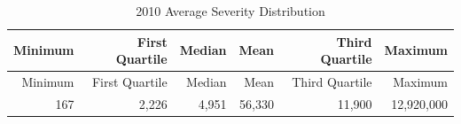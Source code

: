\documentclass[]{book}
\begin{document}
\begin{longtable}[]{@{}rrrrrr@{}}
\caption{\label{tab:Severity2010} 2010 Average Severity
Distribution}\tabularnewline
\toprule
\begin{minipage}[b]{0.12\columnwidth}\raggedleft\strut
Minimum\strut
\end{minipage} & \begin{minipage}[b]{0.13\columnwidth}\raggedleft\strut
First Quartile\strut
\end{minipage} & \begin{minipage}[b]{0.10\columnwidth}\raggedleft\strut
Median\strut
\end{minipage} & \begin{minipage}[b]{0.10\columnwidth}\raggedleft\strut
Mean\strut
\end{minipage} & \begin{minipage}[b]{0.13\columnwidth}\raggedleft\strut
Third Quartile\strut
\end{minipage} & \begin{minipage}[b]{0.14\columnwidth}\raggedleft\strut
Maximum\strut
\end{minipage}\tabularnewline
\midrule
\endfirsthead
\toprule
\begin{minipage}[b]{0.12\columnwidth}\raggedleft\strut
Minimum\strut
\end{minipage} & \begin{minipage}[b]{0.13\columnwidth}\raggedleft\strut
First Quartile\strut
\end{minipage} & \begin{minipage}[b]{0.10\columnwidth}\raggedleft\strut
Median\strut
\end{minipage} & \begin{minipage}[b]{0.10\columnwidth}\raggedleft\strut
Mean\strut
\end{minipage} & \begin{minipage}[b]{0.13\columnwidth}\raggedleft\strut
Third Quartile\strut
\end{minipage} & \begin{minipage}[b]{0.14\columnwidth}\raggedleft\strut
Maximum\strut
\end{minipage}\tabularnewline
\midrule
\endhead
\begin{minipage}[t]{0.12\columnwidth}\raggedleft\strut
167\strut
\end{minipage} & \begin{minipage}[t]{0.13\columnwidth}\raggedleft\strut
2,226\strut
\end{minipage} & \begin{minipage}[t]{0.10\columnwidth}\raggedleft\strut
4,951\strut
\end{minipage} & \begin{minipage}[t]{0.10\columnwidth}\raggedleft\strut
56,330\strut
\end{minipage} & \begin{minipage}[t]{0.13\columnwidth}\raggedleft\strut
11,900\strut
\end{minipage} & \begin{minipage}[t]{0.14\columnwidth}\raggedleft\strut
12,920,000\strut
\end{minipage}\tabularnewline
\bottomrule
\end{longtable}
\end{document}
